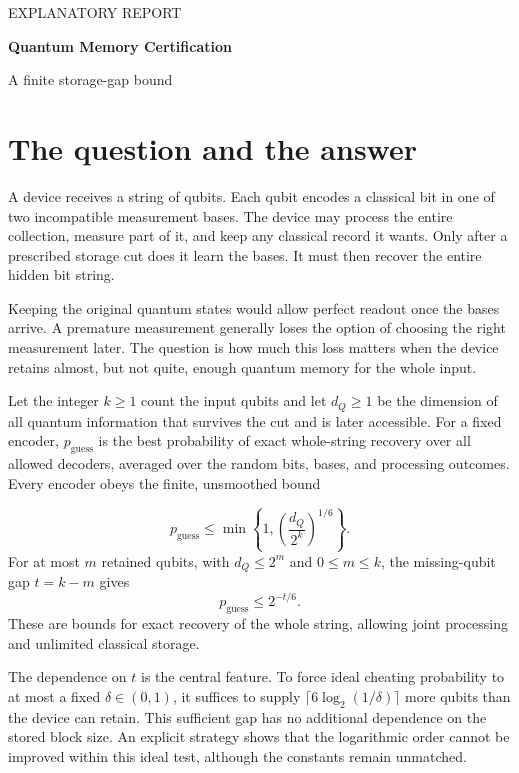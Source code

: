 \documentclass[11pt,a4paper]{article}
\newcommand{\pguess}{p_{\mathrm{guess}}}
\begin{document}
\thispagestyle{plain}
{\sffamily\color{accent}\small EXPLANATORY REPORT\par}
\vspace{3mm}
{\LARGE\bfseries\color{ink}Quantum Memory Certification\par}
\vspace{2mm}
{\Large A finite storage-gap bound\par}
\vspace{4mm}

\section{The question and the answer}
A device receives a string of qubits. Each qubit encodes a classical bit in one of two incompatible measurement bases. The device may process the entire collection, measure part of it, and keep any classical record it wants. Only after a prescribed storage cut does it learn the bases. It must then recover the entire hidden bit string.

Keeping the original quantum states would allow perfect readout once the bases arrive. A premature measurement generally loses the option of choosing the right measurement later. The question is how much this loss matters when the device retains almost, but not quite, enough quantum memory for the whole input.

Let the integer $k\geq1$ count the input qubits and let $d_Q\geq1$ be the dimension of all quantum information that survives the cut and is later accessible. For a fixed encoder, $\pguess$ is the best probability of exact whole-string recovery over all allowed decoders, averaged over the random bits, bases, and processing outcomes. Every encoder obeys the finite, unsmoothed bound
\begin{keybox}
\begin{equation}\label{eq:main}
\pguess\leq\min\left\{1,\left(\frac{d_Q}{2^k}\right)^{1/6}\right\}.
\end{equation}
For at most $m$ retained qubits, with $d_Q\leq2^m$ and $0\leq m\leq k$, the missing-qubit gap $t=k-m$ gives
\begin{equation}\label{eq:gap}
\pguess\leq2^{-t/6}.
\end{equation}
These are bounds for exact recovery of the whole string, allowing joint processing and unlimited classical storage.
\end{keybox}

The dependence on $t$ is the central feature. To force ideal cheating probability to at most a fixed $\delta\in(0,1)$, it suffices to supply $\lceil6\log_2(1/\delta)\rceil$ more qubits than the device can retain. This sufficient gap has no additional dependence on the stored block size. An explicit strategy shows that the logarithmic order cannot be improved within this ideal test, although the constants remain unmatched.
\end{document}
